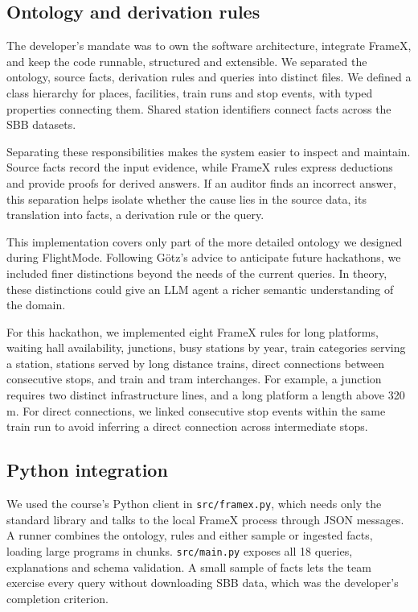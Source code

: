 \documentclass[10pt]{article}
\begin{document}
\subsection{Ontology and derivation rules}
\label{sec:ontology}

The developer's mandate was to own the software architecture, integrate FrameX, and keep the code runnable, structured and extensible. We separated the ontology, source facts, derivation rules and queries into distinct files. We defined a class hierarchy for places, facilities, train runs and stop events, with typed properties connecting them. Shared station identifiers connect facts across the SBB datasets.

Separating these responsibilities makes the system easier to inspect and maintain. Source facts record the input evidence, while FrameX rules express deductions and provide proofs for derived answers. If an auditor finds an incorrect answer, this separation helps isolate whether the cause lies in the source data, its translation into facts, a derivation rule or the query.

This implementation covers only part of the more detailed ontology we designed during FlightMode. Following Götz's advice to anticipate future hackathons, we included finer distinctions beyond the needs of the current queries. In theory, these distinctions could give an LLM agent a richer semantic understanding of the domain.

For this hackathon, we implemented eight FrameX rules for long platforms, waiting hall availability, junctions, busy stations by year, train categories serving a station, stations served by long distance trains, direct connections between consecutive stops, and train and tram interchanges. For example, a junction requires two distinct infrastructure lines, and a long platform a length above 320\,m. For direct connections, we linked consecutive stop events within the same train run to avoid inferring a direct connection across intermediate stops.

\subsection{Python integration}
\label{sec:integration}

We used the course's Python client in \texttt{src/framex.py}, which needs only the standard library and talks to the local FrameX process through JSON messages. A runner combines the ontology, rules and either sample or ingested facts, loading large programs in chunks. \texttt{src/main.py} exposes all 18 queries, explanations and schema validation. A small sample of facts lets the team exercise every query without downloading SBB data, which was the developer's completion criterion.
\end{document}
